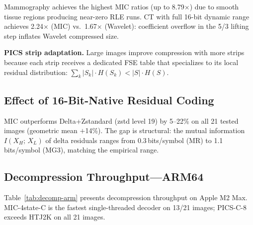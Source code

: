 \documentclass[journal]{IEEEtran}
\begin{document}
Mammography achieves the highest MIC ratios (up to 8.79$\times$) due to smooth
tissue regions producing near-zero RLE runs. CT with full 16-bit dynamic range
achieves 2.24$\times$ (MIC) vs.\ 1.67$\times$ (Wavelet): coefficient overflow in
the 5/3 lifting step inflates Wavelet compressed size.

\textbf{PICS strip adaptation.} Large images improve compression with more
strips because each strip receives a dedicated FSE table that specializes to its
local residual distribution: $\sum_k |S_k| \cdot H(S_k) < |S| \cdot H(S)$.

\subsection{Effect of 16-Bit-Native Residual Coding}

MIC outperforms Delta+Zstandard (zstd level 19) by 5--22\% on all 21 tested
images (geometric mean $+$14\%). The gap is structural: the mutual information
$I(X_H;\, X_L)$ of delta residuals ranges from 0.3\,bits/symbol (MR) to
1.1\,bits/symbol (MG3), matching the empirical range.

\subsection{Decompression Throughput---ARM64}

Table~\ref{tab:decomp-arm} presents decompression throughput on Apple M2 Max.
MIC-4state-C is the fastest single-threaded decoder on 13/21 images; PICS-C-8
exceeds HTJ2K on all 21 images.
\end{document}
